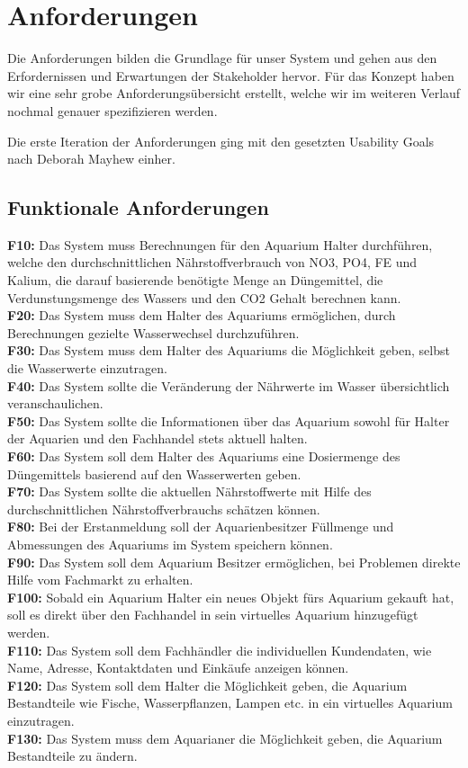 \chapter{Anforderungen}
Die Anforderungen bilden die Grundlage für unser System und gehen aus den Erfordernissen und Erwartungen der Stakeholder hervor. Für das Konzept haben wir eine sehr grobe Anforderungsübersicht erstellt, welche wir im weiteren Verlauf nochmal genauer spezifizieren werden.

Die erste Iteration der Anforderungen ging mit den gesetzten Usability Goals nach Deborah Mayhew einher.

\section{Funktionale Anforderungen}

	\textbf{F10:} Das System muss Berechnungen für den Aquarium Halter durchführen, welche den durchschnittlichen Nährstoffverbrauch von NO3, PO4, FE und Kalium, die darauf basierende benötigte Menge an Düngemittel, die Verdunstungsmenge des Wassers und den CO2 Gehalt berechnen kann.\\
	\textbf{F20: }Das System muss dem Halter des Aquariums ermöglichen, durch Berechnungen gezielte Wasserwechsel durchzuführen.\\
	\textbf{F30:} Das System muss dem Halter des Aquariums die Möglichkeit geben, selbst die Wasserwerte einzutragen.\\
\textbf{F40: }Das System sollte die Veränderung der Nährwerte im Wasser übersichtlich veranschaulichen.\\
	\textbf{F50: }Das System sollte die Informationen über das Aquarium sowohl für Halter der Aquarien und den Fachhandel stets aktuell halten.\\
	\textbf{F60:} Das System soll dem Halter des Aquariums eine Dosiermenge des Düngemittels basierend auf den Wasserwerten geben.\\
	\textbf{F70:} Das System sollte die aktuellen Nährstoffwerte mit Hilfe des durchschnittlichen Nährstoffverbrauchs schätzen können.\\
	\textbf{F80:} Bei der Erstanmeldung soll der Aquarienbesitzer Füllmenge und Abmessungen des Aquariums im System speichern können.\\
	\textbf{F90:} Das System soll dem Aquarium Besitzer ermöglichen, bei Problemen direkte Hilfe vom Fachmarkt zu erhalten.\\
	\textbf{F100:} Sobald ein Aquarium Halter ein neues Objekt fürs Aquarium gekauft hat, soll es direkt über den Fachhandel in sein virtuelles Aquarium hinzugefügt werden.\\
	\textbf{F110:} Das System soll dem Fachhändler die individuellen Kundendaten, wie Name, Adresse, Kontaktdaten und Einkäufe anzeigen können.\\
	\textbf{F120:} Das System soll dem Halter die Möglichkeit geben, die Aquarium Bestandteile wie Fische, Wasserpflanzen, Lampen etc.  in ein virtuelles Aquarium einzutragen.\\
	\textbf{F130:} Das System muss dem Aquarianer die Möglichkeit geben, die Aquarium Bestandteile zu ändern.

